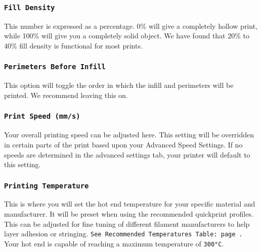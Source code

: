 \subsubsection{\texttt{Fill Density}}
This number is expressed as a percentage. 0\% will give a completely hollow print, while 100\% will give you a completely solid object. We have found that 20\% to 40\% fill density is functional for most prints.

\subsubsection{\texttt{Perimeters Before Infill}}
This option will toggle the order in which the infill and perimeters will be printed. We recommend leaving this on.

\subsubsection{\texttt{Print Speed (mm/s)}}
Your overall printing speed can be adjusted here. This setting will be overridden in certain parts of the print based upon your Advanced Speed Settings. If no speeds are determined in the advanced settings tab, your printer will default to this setting. %


\subsubsection{\texttt{Printing Temperature}}
This is where you will set the hot end temperature for your specific material and manufacturer. It will be preset when using the recommended quickprint profiles. This can be adjusted for fine tuning of different filament manufacturers to help layer adhesion or stringing. \texttt{See Recommended Temperatures Table: page \pageref{tab:a}.} Your hot end is capable of reaching a maximum temperature of \texttt{300°C}.


